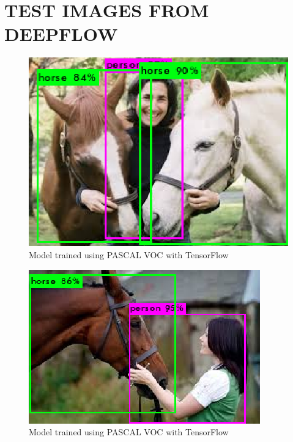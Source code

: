 %
%
%


\chapter{\uppercase {TEST IMAGES FROM DEEPFLOW}}

\begin{figure}[h]
\centering
\includegraphics[scale=0.8]{figures/prediction_1.png}
\caption{Model trained  using PASCAL VOC with TensorFlow}
\label{prediction(1)}
\end{figure}


\begin{figure}[h]
\centering
\includegraphics[scale=0.8]{figures/prediction_2.png}
\caption{Model trained  using PASCAL VOC with TensorFlow}
\label{prediction(2)}
\end{figure}

